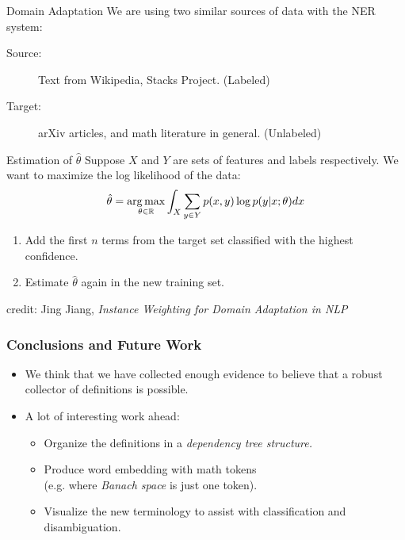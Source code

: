 \documentclass[10pt]{beamer}
\DeclareMathOperator*{\argmax}{arg\,max}
\DeclareMathOperator*{\argmin}{\arg\min}
\begin{document}
\begin{frame}{Domain Adaptation}
   We are using two similar sources of data with the NER system:
    \begin{description}
        \item[Source:] Text from Wikipedia, Stacks Project. (Labeled)
        \item[Target:] arXiv articles, and math literature in general. (Unlabeled)
    \end{description}
    \begin{exampleblock}{Estimation of $\hat\theta$}
        Suppose $X$ and $Y$ are sets of features and labels respectively. We want to maximize the log likelihood of the data:
$$\hat\theta= \argmax_{\theta \in \RR} \int_X \sum_{y\in Y} p(x,y)\log p(y|x;\theta)dx $$
    \end{exampleblock}
    \begin{enumerate}
        \item Add the first $n$ terms from the target set classified with the highest confidence.
        \item Estimate $\hat \theta$ again in the new training set.
    \end{enumerate}
    
    \begin{flushright}
        {\small credit: Jing Jiang, \textit{Instance Weighting for Domain Adaptation in NLP}}
    \end{flushright}
\end{frame}

\begin{frame} 
    \frametitle{Conclusions and Future Work}
    \begin{itemize}
            \item We think that we have collected enough evidence to believe that a robust collector of definitions is possible.
            \item A lot of interesting work ahead:
                \begin{itemize}
                    \item Organize the definitions in a \emph{dependency tree structure.}
                    \item Produce word embedding with math tokens\\
                        (e.g. where \emph{Banach space} is just one token).
                \item Visualize the new terminology to assist with classification and disambiguation. 
                \end{itemize}
    \end{itemize}
\end{frame}

\begin{frame}
\titlepage
\end{frame}
\end{document}
